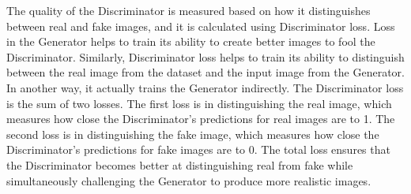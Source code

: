 The quality of the Discriminator is measured based on how it distinguishes between real and fake images, and it is calculated using Discriminator loss. Loss in the Generator helps to train its ability to create better images to fool the Discriminator. Similarly, Discriminator loss helps to train its ability to distinguish between the real image from the dataset and the input image from the Generator. In another way, it actually trains the Generator indirectly. The Discriminator loss is the sum of two losses. The first loss is in distinguishing the real image, which measures how close the Discriminator's predictions for real images are to 1. The second loss is in distinguishing the fake image, which measures how close the Discriminator's predictions for fake images are to 0. The total loss ensures that the Discriminator becomes better at distinguishing real from fake while simultaneously challenging the Generator to produce more realistic images.